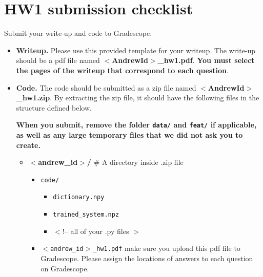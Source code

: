 \documentclass[11pt]{article}
\numberwithin{equation}{section} %
\numberwithin{figure}{section} %
\numberwithin{table}{section} %
\begin{document}
\section{HW1 submission checklist}
\label{sec:SubChecklist}
Submit your write-up and code to Gradescope.
\begin{itemize}
\item {\bf Writeup.} Please use this provided template for your writeup.
  The write-up should be a pdf file named {\bf $<$AndrewId$>$\_hw1.pdf}. \textbf{You must select the pages of the writeup that correspond to each question}. 
\item {\bf Code.} 
The code should be submitted as a zip file named {\bf $<$AndrewId$>$\_hw1.zip}. By extracting the zip file, it should have the following files in the structure defined below.

{\bf When you submit, remove the folder {\tt data/} and {\tt feat/} if applicable, as well as any large temporary files that we did not ask you to create.}

\begin{itemize}
\item {\bf $<$andrew\_id$>$/ }  \# A directory inside .zip file
\begin{itemize}
	\item {\tt code/ }
	\begin{itemize}
		\item {\tt dictionary.npy }
		\item {\tt trained\_system.npz }
		\item $<$!-- all of your .py files $>$
	\end{itemize}
    \item {\tt $<$andrew\_id$>$\_hw1.pdf}  make sure you upload this pdf file to Gradescope. Please assign the locations of answers to each question on Gradescope.
\end{itemize}

\end{itemize}
\end{itemize}



\end{document}
